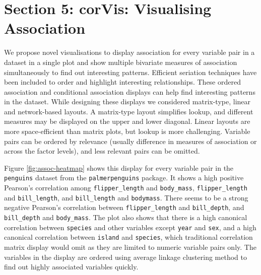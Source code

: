 \hypertarget{section-5-corvis-visualising-association}{%
\section{Section 5: corVis: Visualising
Association}\label{section-5-corvis-visualising-association}}

We propose novel visualisations to display association for every
variable pair in a dataset in a single plot and show multiple bivariate
measures of association simultaneously to find out interesting patterns.
Efficient seriation techniques have been included to order and highlight
interesting relationships. These ordered association and conditional
association displays can help find interesting patterns in the dataset.
While designing these displays we considered matrix-type, linear and
network-based layouts. A matrix-type layout simplifies lookup, and
different measures may be displayed on the upper and lower diagonal.
Linear layouts are more space-efficient than matrix plots, but lookup is
more challenging. Variable pairs can be ordered by relevance (usually
difference in measures of association or across the factor levels), and
less relevant pairs can be omitted.

Figure \ref{fig:assoc-heatmap} shows this display for every variable
pair in the \texttt{penguins} dataset from the \texttt{palmerpenguins}
package. It shows a high positive Pearson's correlation among
\texttt{flipper\_length} and \texttt{body\_mass},
\texttt{flipper\_length} and \texttt{bill\_length}, and
\texttt{bill\_length} and \texttt{bodymass}. There seems to be a strong
negative Pearson's correlation between \texttt{flipper\_length} and
\texttt{bill\_depth}, and \texttt{bill\_depth} and \texttt{body\_mass}.
The plot also shows that there is a high canonical correlation between
\texttt{species} and other variables except \texttt{year} and
\texttt{sex}, and a high canonical correlation between \texttt{island}
and \texttt{species}, which traditional correlation matrix display would
omit as they are limited to numeric variable pairs only. The variables
in the display are ordered using average linkage clustering method to
find out highly associated variables quickly.

